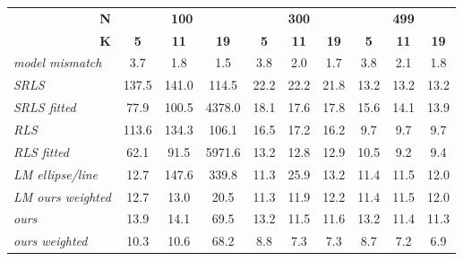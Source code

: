 \begin{tabular}{l|ccc|ccc|ccc|}
\toprule
\multicolumn{1}{r|}{\textbf{N}} & \multicolumn{3}{c|}{\textbf{100}} & \multicolumn{3}{c|}{\textbf{300}} & \multicolumn{3}{c|}{\textbf{499}} \\
\multicolumn{1}{r|}{\textbf{K}} &   \textbf{5} &   \textbf{11}&    \textbf{19}&  \textbf{5} &  \textbf{11}&  \textbf{19}&  \textbf{5} &  \textbf{11}&  \textbf{19}\\
\midrule
\textit{model mismatch  } &   3.7 &   1.8 &    1.5 &  3.8 &  2.0 &  1.7 &  3.8 &  2.1 &  1.8 \\
\midrule \textit{SRLS            } & 137.5 & 141.0 &  114.5 & 22.2 & 22.2 & 21.8 & 13.2 & 13.2 & 13.2 \\
\textit{SRLS fitted     } &  77.9 & 100.5 & 4378.0 & 18.1 & 17.6 & 17.8 & 15.6 & 14.1 & 13.9 \\
\textit{RLS             } & 113.6 & 134.3 &  106.1 & 16.5 & 17.2 & 16.2 &  \cellcolor{\secondcolor}9.7 &  \cellcolor{\secondcolor}9.7 &  \cellcolor{\secondcolor}9.7 \\
\textit{RLS fitted      } &  62.1 &  91.5 & 5971.6 & 13.2 & 12.8 & 12.9 & 10.5 &  \cellcolor{\secondcolor}9.2 &  \cellcolor{\secondcolor}9.4 \\
\textit{LM ellipse/line } &  \cellcolor{\secondcolor}12.7 & 147.6 &  339.8 & \cellcolor{\secondcolor}11.3 & 25.9 & 13.2 & 11.4 & \cellcolor{\secondcolor}11.5 & 12.0 \\
\textit{LM ours weighted} &  \cellcolor{\secondcolor}12.7 &  \cellcolor{\secondcolor}13.0 &   \cellcolor{\firstcolor}20.5 & \cellcolor{\secondcolor}11.3 & 11.9 & 12.2 & 11.4 & \cellcolor{\secondcolor}11.5 & 12.0 \\
\textit{ours            } &  13.9 &  14.1 &   69.5 & 13.2 & \cellcolor{\secondcolor}11.5 & \cellcolor{\secondcolor}11.6 & 13.2 & 11.4 & \cellcolor{\secondcolor}11.3 \\
\textit{ours weighted   } &  \cellcolor{\firstcolor}10.3 &  \cellcolor{\firstcolor}10.6 &   \cellcolor{\secondcolor}68.2 &  \cellcolor{\firstcolor}8.8 &  \cellcolor{\firstcolor}7.3 &  \cellcolor{\firstcolor}7.3 &  \cellcolor{\firstcolor}8.7 &  \cellcolor{\firstcolor}7.2 &  \cellcolor{\firstcolor}6.9 \\
\bottomrule
\end{tabular}
